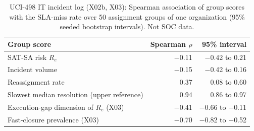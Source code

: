 \begin{table}[!htbp]
\caption{UCI-498 IT incident log (X02b, X03): Spearman association of group scores
with the SLA-miss rate over 50 assignment groups of one organization
(95\% seeded bootstrap intervals). Not SOC data.}
\label{tab:external}
\centering
\scriptsize
\begin{tabular}{@{}L{6.2cm}rr@{}}
\toprule
Group score & Spearman $\rho$ & 95\% interval \\
\midrule
SAT-SA risk $R_e$ & \ensuremath{-}0.11 & \ensuremath{-}0.42 to 0.21 \\
Incident volume & \ensuremath{-}0.15 & \ensuremath{-}0.42 to 0.16 \\
Reassignment rate & 0.37 & 0.08 to 0.60 \\
Slowest median resolution (upper reference) & 0.94 & 0.86 to 0.97 \\
\midrule
Execution-gap dimension of $R_e$ (X03) & \ensuremath{-}0.41 & \ensuremath{-}0.66 to \ensuremath{-}0.11 \\
Fast-closure prevalence (X03) & \ensuremath{-}0.70 & \ensuremath{-}0.82 to \ensuremath{-}0.52 \\
\bottomrule
\end{tabular}
\end{table}
